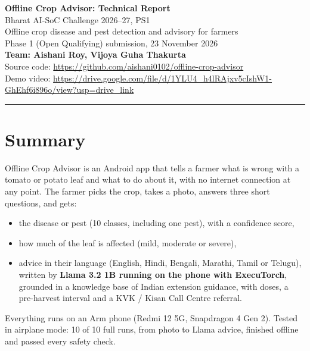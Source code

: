 \documentclass[11pt,a4paper]{article}
\begin{document}
\begin{center}
  {\LARGE\bfseries Offline Crop Advisor: Technical Report}\\[0.9em]
  {\large Bharat AI-SoC Challenge 2026--27, PS1}\\[0.35em]
  {\normalsize Offline crop disease and pest detection and advisory for farmers}\\[0.9em]
  {\normalsize Phase 1 (Open Qualifying) submission, 23 November 2026}\\[0.5em]
  {\normalsize\bfseries Team: Aishani Roy, Vijoya Guha Thakurta}\\[0.6em]
  {\small Source code: \url{https://github.com/aishani0102/offline-crop-advisor}}\\[0.3em]
  {\small Demo video: \url{https://drive.google.com/file/d/1YLU4_h4lRAjxv5cIshW1-GhEhf6i896o/view?usp=drive_link}}
\end{center}

\vspace{0.6em}
\hrule
\vspace{1.2em}

\section{Summary}

Offline Crop Advisor is an Android app that tells a farmer what is wrong with a
tomato or potato leaf and what to do about it, with no internet connection at any
point. The farmer picks the crop, takes a photo, answers three short questions,
and gets:

\begin{itemize}
  \item the disease or pest (10 classes, including one pest), with a confidence score,
  \item how much of the leaf is affected (mild, moderate or severe),
  \item advice in their language (English, Hindi, Bengali, Marathi, Tamil or
        Telugu), written by \textbf{Llama 3.2 1B running on the phone with
        ExecuTorch}, grounded in a knowledge base of Indian extension guidance,
        with doses, a pre-harvest interval and a KVK / Kisan Call Centre referral.
\end{itemize}

Everything runs on an Arm phone (Redmi 12 5G, Snapdragon 4 Gen 2). Tested in
airplane mode: 10 of 10 full runs, from photo to Llama advice, finished offline
and passed every safety check.
\end{document}
